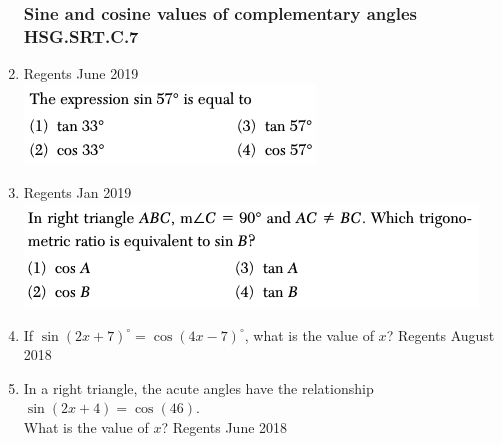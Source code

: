 \begin{enumerate}
\subsubsection*{Sine and cosine values of complementary angles \hfill HSG.SRT.C.7}
\item Regents June 2019\\
 \includegraphics[scale=0.65]{../graphics/sine-cos-9_Jun2019.png}

\item Regents Jan 2019 \\
\includegraphics[scale=0.65]{../graphics/sine-cos-9_Jan2019.png}

\item If $\sin(2x+7)^\circ = \cos(4x-7)^\circ$, what is the value of $x$? \hfill Regents August 2018
\vspace{1cm}

\item In a right triangle, the acute angles have the relationship $\sin(2x + 4) =\cos (46)$. \\[0.25cm]
What is the value of $x$? \hfill Regents June 2018

\end{enumerate}

  